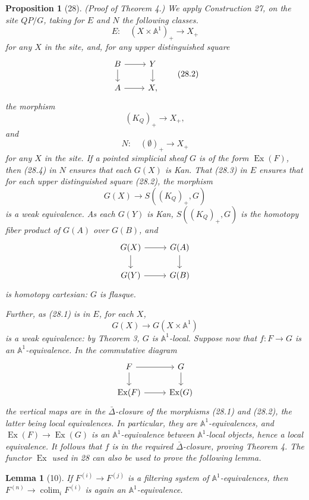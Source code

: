 \documentclass[11pt]{article}
\newcommand{\Aone}{\mathbb A^1}
\theoremstyle{deligne}
\newtheorem*{proposition*}{Proposition}
\newtheorem*{lemma*}{Lemma}
\newcommand{\colim}{\operatorname{colim}}
\newcommand{\Ex}{\operatorname{Ex}}
\begin{document}
\begin{proposition*}[28]
(Proof of Theorem 4.) We apply Construction 27, on the site \(QP/G\), taking for \(E\) and \(N\) the following classes.
\[
E:\quad (X\times \Aone)_+\longrightarrow X_+ \tag{28.1}
\]
for any \(X\) in the site, and, for any upper distinguished square
\[
\begin{tikzcd}[column sep=2.4em,row sep=1.5em]
B \arrow[r] \arrow[d] & Y \arrow[d] \\
A \arrow[r] & X,
\end{tikzcd}
\tag{28.2}
\]
the morphism
\[
(K_Q)_+\longrightarrow X_+,
\tag{28.3}
\]
and
\[
N:\quad (\emptyset)_+\longrightarrow X_+
\tag{28.4}
\]
for any \(X\) in the site. If a pointed simplicial sheaf \(G\) is of the form \(\Ex(F)\), then (28.4) in \(N\) ensures that each \(G(X)\) is Kan. That (28.3) in \(E\) ensures that for each upper distinguished square (28.2), the morphism
\[
G(X)\longrightarrow S((K_Q)_+,G)
\]
is a weak equivalence. As each \(G(Y)\) is Kan, \(S((K_Q)_+,G)\) is the homotopy fiber product of \(G(A)\) over \(G(B)\), and
\[
\begin{tikzcd}[column sep=2.6em,row sep=1.6em]
G(X) \arrow[r] \arrow[d] & G(A) \arrow[d] \\
G(Y) \arrow[r] & G(B)
\end{tikzcd}
\]
is homotopy cartesian: \(G\) is flasque.

Further, as (28.1) is in \(E\), for each \(X\),
\[
G(X)\longrightarrow G(X\times\Aone)
\]
is a weak equivalence: by Theorem 3, \(G\) is \(\Aone\)-local. Suppose now that \(f:F\to G\) is an \(\Aone\)-equivalence. In the commutative diagram
\[
\begin{tikzcd}[column sep=2.6em,row sep=1.6em]
F \arrow[r] \arrow[d] & G \arrow[d] \\
\Ex(F) \arrow[r] & \Ex(G)
\end{tikzcd}
\]
the vertical maps are in the \(\bar\Delta\)-closure of the morphisms (28.1) and (28.2), the latter being local equivalences. In particular, they are \(\Aone\)-equivalences, and \(\Ex(F)\to\Ex(G)\) is an \(\Aone\)-equivalence between \(\Aone\)-local objects, hence a local equivalence. It follows that \(f\) is in the required \(\bar\Delta\)-closure, proving Theorem 4. The functor \(\Ex\) used in 28 can also be used to prove the following lemma.
\end{proposition*}

\begin{lemma*}[10]
If \(F^{(i)}\to F^{(j)}\) is a filtering system of \(\Aone\)-equivalences, then \(F^{(n)}\to \colim_iF^{(i)}\) is again an \(\Aone\)-equivalence.
\end{lemma*}
\end{document}

